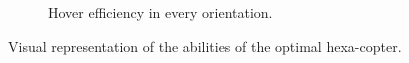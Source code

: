 {\begin{figure}[!ht]
{\begin{subfigure}[b]{0.47\textwidth}
    \caption{Hover efficiency in every orientation.} \label{fig:hexa_hspace}
  \end{subfigure}}
  \caption{Visual representation of the abilities of the optimal hexa-copter.}
  \label{fig:Hexacopter_spaces}
\end{figure}

\begin{figure}[!ht]
\end{figure}}
